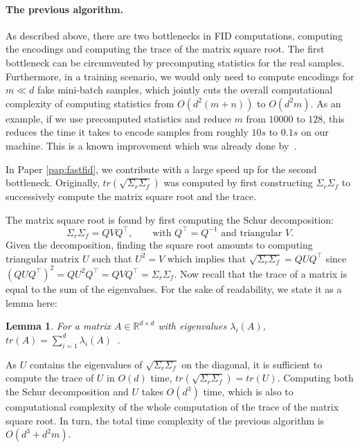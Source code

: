 \documentclass[11pt,a4paper,twoside,openright,final]{memoir}
\newtheorem{lemma}{Lemma}
\newcommand*{\paperref}[1]{Paper \hyperref[#1]{\ref{#1}}}
\begin{document}
\paragraph{The previous algorithm.} As described above, there are two bottlenecks in FID computations, computing the encodings and computing the trace of the matrix square root.
The first bottleneck can be circumvented by precomputing statistics for the real samples.
Furthermore, in a training scenario, we would only need to compute encodings for $m \ll d$ fake mini-batch samples, which jointly cuts the overall computational complexity of computing statistics from $O(d^2(m+n))$ to $O(d^2m)$.
As an example, if we use precomputed statistics and reduce $m$ from $10 000$ to $128$, this reduces the time it takes to encode samples from roughly $10s$ to $0.1s$ on our machine.
This is a known improvement which was already done by~\cite{fid}.

In \paperref{pap:fastfid}, we contribute with a large speed up for the second bottleneck.
Originally, $tr( \sqrt{\Sigma_r \Sigma_f} )$ was computed by first constructing $\Sigma_r \Sigma_f$ to successively compute the matrix square root and the trace.

The matrix square root is found by first computing the Schur decomposition:
\begin{equation}\label{eq:schur}
    \Sigma_r\Sigma_f = QVQ^\intercal, \qquad \text{with }Q^\intercal = Q^{-1}\text{ and triangular }V.
\end{equation}
Given the decomposition, finding the square root amounts to computing triangular matrix $U$ such that $U^2 = V$ which implies that $\sqrt{\Sigma_r \Sigma_f} = QUQ^\intercal$ since $(QUQ^\intercal)^2 = QU^2Q^\intercal = QVQ^\intercal = \Sigma_r\Sigma_f$.
Now recall that the trace of a matrix is equal to the sum of the eigenvalues.
For the sake of readability, we state it as a lemma here:
\begin{lemma}\label{lem:trase-eigenvalues}
    For a matrix $A\in\mathbb{R}^{d\times d}$ with eigenvalues $\lambda_i(A)$, $tr(A) = \sum_{i=1}^{d}\lambda_i(A)$~\cite{matrix-cookbook}.
\end{lemma}
As $U$ contains the eigenvalues of $\sqrt{\Sigma_r\Sigma_f}$ on the diagonal, it is sufficient to compute the trace of $U$ in $O(d)$ time, $tr(\sqrt{\Sigma_r\Sigma_f}) = tr(U)$.
Computing both the Schur decomposition and $U$ takes $O(d^3)$ time, which is also to computational complexity of the whole computation of the trace of the matrix square root.
In turn, the total time complexity of the previous algorithm is $O(d^3 + d^2m)$.
\end{document}
